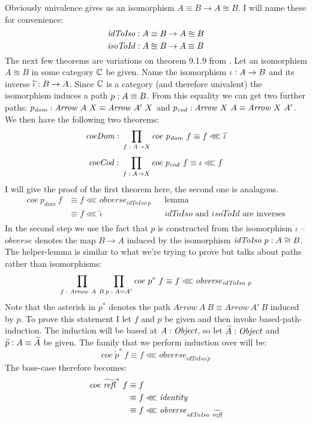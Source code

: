 Obviously univalence gives us an isomorphism $A \equiv B \to A \approxeq B$. I
will name these for convenience:
%
$$
\mathit{idToIso} \;\mathord{:}\; A \equiv B \to A \approxeq B
$$
%
$$
\mathit{isoToId} \;\mathord{:}\; A \approxeq B \to A \equiv B
$$
%
The next few theorems are variations on theorem 9.1.9 from \cite{hott-2013}. Let
an isomorphism $A \approxeq B$ in some category $\mathbb{C}$ be given. Name the
isomorphism $\iota \;\mathord{:}\; A \to B$ and its inverse $\widetilde{\iota} \;\mathord{:}\; B \to A$.
Since $\mathbb{C}$ is a category (and therefore univalent) the isomorphism induces a
path $p \;\mathord{:}\; A \equiv B$. From this equality we can get two further paths:
$p_{\mathit{dom}} \;\mathord{:}\; \mathit{Arrow}\ A\ X \equiv \mathit{Arrow}\ A'\ X$ and
$p_{\mathit{cod}} \;\mathord{:}\; \mathit{Arrow}\ X\ A \equiv \mathit{Arrow}\ X\ A'$. We
then have the following two theorems:
%
$$
\mathit{coeDom} \;\mathord{:}\; \prod_{f \;\mathord{:}\; A \to X} \mathit{coe}\ p_{\mathit{dom}}\ f \equiv f \lll \widetilde{\iota}
$$
%
%
$$
\mathit{coeCod} \;\mathord{:}\; \prod_{f \;\mathord{:}\; A \to X} \mathit{coe}\ p_{\mathit{cod}}\ f \equiv \iota \lll f
$$
%
I will give the proof of the first theorem here, the second one is analagous.
\begin{align*}
\mathit{coe}\ p_{\mathit{dom}}\ f
  & \equiv f \lll \mathit{obverse}_{\mathit{idToIso}\ p} && \text{lemma} \\
  & \equiv f \lll \widetilde{\iota}
    && \text{$\mathit{idToIso}$ and $\mathit{isoToId}$ are inverses}\\
\end{align*}
%
In the second step we use the fact that $p$ is constructed from the isomorphism
$\iota$ -- $\mathit{obverse}$ denotes the map $B \to A$ induced by the
isomorphism $\mathit{idToIso}\ p \tp A \cong B$. The helper-lemma is similar to
what we're trying to prove but talks about paths rather than isomorphisms:
%
$$
\prod_{f \;\mathord{:}\; \mathit{Arrow}\ A\ B} \prod_{p \;\mathord{:}\; A \equiv A'} \mathit{coe}\ p^*\ f \equiv f \lll \mathit{obverse}_{\mathit{idToIso}\ p}
$$
%
Note that the asterisk in $p^*$ denotes the path $\mathit{Arrow}\ A\ B \equiv
\mathit{Arrow}\ A'\ B$ induced by $p$. To prove this statement I let $f$ and $p$
be given and then invoke based-path-induction. The induction will be based at $A
\;\mathord{:}\; \mathit{Object}$, so let $\widetilde{A} \;\mathord{:}\; \mathit{Object}$ and $\widetilde{p} \;\mathord{:}\;
A \equiv \widetilde{A}$ be given. The family that we perform induction over will
be:
%
$$
\mathit{coe}\ {\widetilde{p}}^*\ f \equiv f \lll \mathit{obverse}_{\mathit{idToIso}\ \widetilde{p}}
$$
The base-case therefore becomes:
\begin{align*}
\mathit{coe}\ {\widetilde{\refl}}^*\ f
& \equiv f \\
& \equiv f \lll \mathit{identity} \\
& \equiv f \lll \mathit{obverse}_{\mathit{idToIso}\ \widetilde{\refl}}
\end{align*}
